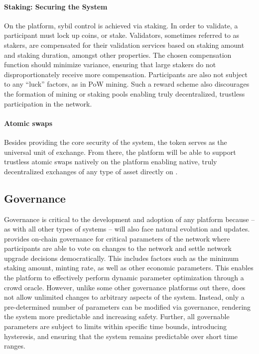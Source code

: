 \documentclass[runningheads]{llncs}
\begin{document}
\paragraph{Staking: Securing the System}
On the \AVAPlatformName{} platform, sybil control is achieved via staking. In order to validate, a participant must lock up coins, or stake. Validators, sometimes referred to as stakers, are compensated for their validation services based on staking amount and staking duration, amongst other properties. The chosen compensation function should minimize variance, ensuring that large stakers do not disproportionately receive more compensation. Participants are also not subject to any ``luck'' factors, as in PoW mining. Such a reward scheme also discourages the formation of mining or staking pools enabling truly decentralized, trustless participation in the network.

\paragraph{Atomic swaps}
Besides providing the core security of the system, the \AVATokenName{} token serves as the universal unit of exchange. From there, the \AVAPlatformName{} platform will be able to support trustless atomic swaps natively on the platform enabling native, truly decentralized exchanges of any type of asset directly on \AVAPlatformName{}. 

\subsection{Governance}
Governance is critical to the development and adoption of any platform because – as with all other types of systems – \AVAPlatformName{} will also face natural evolution and updates. \AVATokenName{} provides on-chain governance for critical parameters of the network where participants are able to vote on changes to the network and settle network upgrade decisions democratically. This includes factors such as the minimum staking amount, minting rate, as well as other economic parameters. This enables the platform to effectively perform dynamic parameter optimization through a crowd oracle. However, unlike some other governance platforms out there, \AVAPlatformName{} does not allow unlimited changes to arbitrary aspects of the system. Instead, only a pre-determined number of parameters can be modified via governance, rendering the system more predictable and increasing safety. Further, all governable parameters are subject to limits within specific time bounds, introducing hysteresis, and ensuring that the system remains predictable over short time ranges. 
\end{document}
